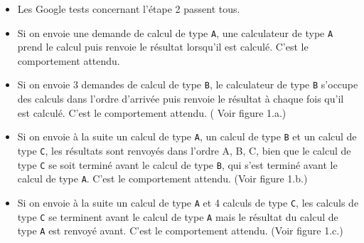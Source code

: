 \documentclass{article}
\begin{document}
\begin{itemize}
    \item Les Google tests concernant l'étape 2 passent tous.
    \item Si on envoie une demande de calcul de type \texttt{A}, une calculateur de type \texttt{A} prend le calcul
    puis renvoie le résultat lorsqu'il est calculé. C'est le comportement attendu.
    \item Si on envoie 3 demandes de calcul de type \texttt{B}, le calculateur de type \texttt{B} s'occupe des calculs
    dans l'ordre d'arrivée puis renvoie le résultat à chaque fois qu'il est calculé. C'est le comportement attendu. (
    Voir figure 1.a.)
    \item Si on envoie à la suite un calcul de type \texttt{A}, un calcul de type \texttt{B} et un calcul de type
    \texttt{C}, les résultats sont renvoyés dans l'ordre A, B, C, bien que le calcul de type \texttt{C} se soit terminé
    avant le calcul de type \texttt{B}, qui s'est terminé avant le calcul de type \texttt{A}. C'est le comportement
    attendu. (Voir figure 1.b.)
    \item Si on envoie à la suite un calcul de type \texttt{A} et 4 calculs de type \texttt{C}, les calculs de type \texttt{C}
    se terminent avant le calcul de type \texttt{A} mais le résultat du calcul de type \texttt{A} est renvoyé avant.
    C'est le comportement attendu. (Voir figure 1.c.)
\end{itemize}
\end{document}
